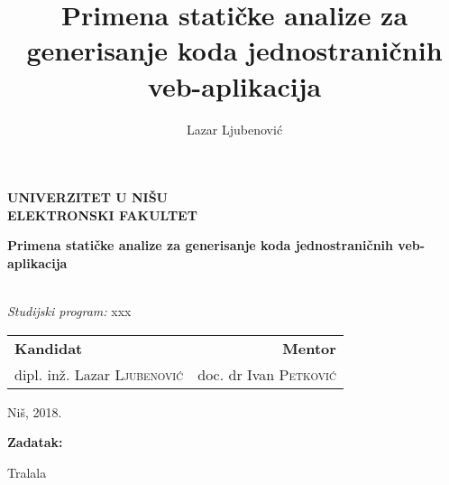 \documentclass[twoside, openright]{report}
\title{Primena statičke analize za generisanje koda jednostraničnih veb-aplikacija}
\author{Lazar Ljubenović}
\makeatletter
\newcommand\frontmatter{%
    \cleardoublepage
  \pagenumbering{roman}}
\makeatother
\begin{document}
   
\begin{titlepage}
  \begin{center}

    \begin{minipage}[b]{0.7\textwidth}
        \centering
        \textbf{UNIVERZITET U NIŠU\\ELEKTRONSKI FAKULTET}
    \end{minipage}%
    
    \vspace{5cm}
    \LARGE
    \textbf{Primena statičke analize za generisanje koda jednostraničnih veb-aplikacija}
    
    \vspace{1cm}
    \normalsize
    \\
    \vspace{.33cm}
    \textit{Studijski program:} xxx
  \end{center}

  \vfill

  \noindent 
  \begin{tabularx}{\textwidth}{XR}
    \textbf{Kandidat}                    & \textbf{Mentor}                \\
    dipl. inž. Lazar \textsc{Ljubenović} & doc. dr Ivan \textsc{Petković}
  \end{tabularx}

  \vfill

  \begin{center}
    Niš, 2018.
  \end{center}
\end{titlepage}


\frontmatter


\textbf{Zadatak:}

\vspace{0.2cm}

Tralala

\vfill
\end{document}
